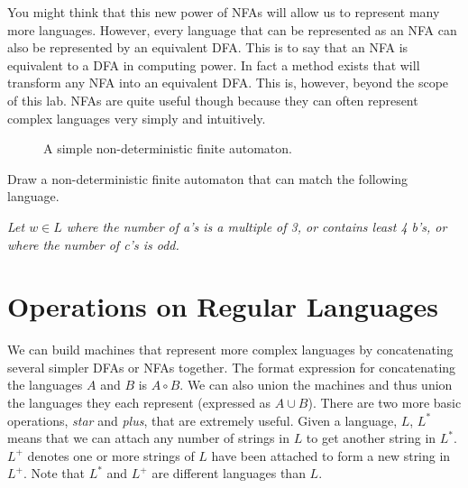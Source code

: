 You might think that this new power of NFAs will allow us to represent many more languages.  However, every language that can be represented as an NFA can also be represented by an equivalent DFA.  This is to say that an NFA is equivalent to a DFA in computing power.
In fact a method exists that will transform any NFA into an equivalent DFA.  This is, however, beyond the scope of this lab.
NFAs are quite useful though because they can often represent complex languages very simply and intuitively.
\begin{figure}
\caption{A simple non-deterministic finite automaton.}
\label{fig:simple_nfa}
\end{figure}

\begin{problem}
Draw a non-deterministic finite automaton that can match the following language.

\emph{Let $w \in L$ where the number of a's is a multiple of 3, or contains least 4 b's, or where the number of c's is odd.}
\label{prob:drawnfa}
\end{problem}


\section*{Operations on Regular Languages}
We can build machines that represent more complex languages by concatenating several simpler DFAs or NFAs together.  The format expression for concatenating the languages $A$ and $B$ is $A \circ B$.  We can also union the machines and thus union the languages they each represent (expressed as $A \cup B$).  
There are two more basic operations, \emph{star} and \emph{plus}, that are extremely useful.  Given a language, $L$, $L^*$ means that we can attach any number of strings in $L$ to get another string in $L^*$.  $L^+$ denotes one or more strings of $L$ have been attached to form a new string in $L^+$.  Note that $L^*$ and $L^+$ are different languages than $L$.

